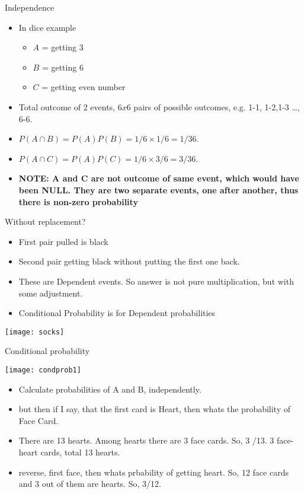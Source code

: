 \begin{frame}{Independence }
\begin{itemize}
\item In dice example  
\begin{itemize}
\item $A$  = getting 3  
\item  $B$ = getting 6
\item  $C$ = getting even number
\end{itemize}
\item Total outcome of 2 events, $6x6$ pairs of possible outcomes, e.g. 1-1, 1-2,1-3 \ldots, 6-6.
\item $P(A \cap B) = P(A)P(B) = 1/6 \times 1/6 = 1/36$. 
\item $P(A \cap C) = P(A)P(C) = 1/6 \times 3/6 = 3/36$. 
\item {\bf NOTE: A and C are not outcome of same event, which would have been NULL. They are two separate events, one after another, thus there is non-zero probability}
\end{itemize}
\end{frame}


\begin{frame}{Without replacement? }
\begin{itemize}
\item First pair pulled is black
\item Second pair getting black without putting the first one back.
\item These are Dependent events. So answer is not pure multiplication, but with some adjustment.
\item Conditional Probability is for Dependent probabilities
\end{itemize}
\begin{center}
\texttt{[image: socks]}
\end{center}
\end{frame}

\begin{frame}{Conditional probability }
\begin{center}
\texttt{[image: condprob1]}
\end{center}
\begin{itemize}
\item Calculate probabilities of A and B, independently.
\item but then if I say, that the first card is Heart, then whats the probability of Face Card.
\item There are 13 hearts. Among hearts there are 3 face cards. So, 3 /13. 3 face-heart cards, total 13 hearts.
\item reverse, first face, then whats prbability of getting heart. So, 12 face cards and 3 out of them are hearts. So, 3/12.
\end{itemize}
\end{frame}


